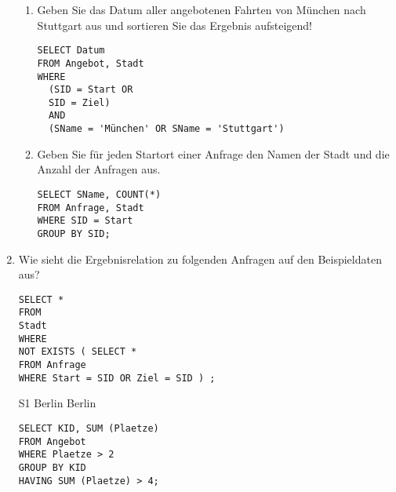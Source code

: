 \documentclass{lehramt-informatik-aufgabe}
\begin{document}
\begin{enumerate}
\begin{enumerate}
%

\item Geben Sie das Datum aller angebotenen Fahrten von München nach
Stuttgart aus und sortieren Sie das Ergebnis aufsteigend!

\begin{verbatim}
SELECT Datum
FROM Angebot, Stadt
WHERE
  (SID = Start OR
  SID = Ziel)
  AND
  (SName = 'München' OR SName = 'Stuttgart')
\end{verbatim}

%

\item Geben Sie für jeden Startort einer Anfrage den Namen der Stadt und
die Anzahl der Anfragen aus.

\begin{verbatim}
SELECT SName, COUNT(*)
FROM Anfrage, Stadt
WHERE SID = Start
GROUP BY SID;
\end{verbatim}

\end{enumerate}

\item Wie sieht die Ergebnisrelation zu folgenden Anfragen auf den
Beispieldaten aus?

\begin{verbatim}
SELECT *
FROM
Stadt
WHERE
NOT EXISTS ( SELECT *
FROM Anfrage
WHERE Start = SID OR Ziel = SID ) ;
\end{verbatim}

\begin{antwort}
S1 Berlin Berlin
\end{antwort}

\begin{verbatim}
SELECT KID, SUM (Plaetze)
FROM Angebot
WHERE Plaetze > 2
GROUP BY KID
HAVING SUM (Plaetze) > 4;
\end{verbatim}

\end{enumerate}
\end{document}
